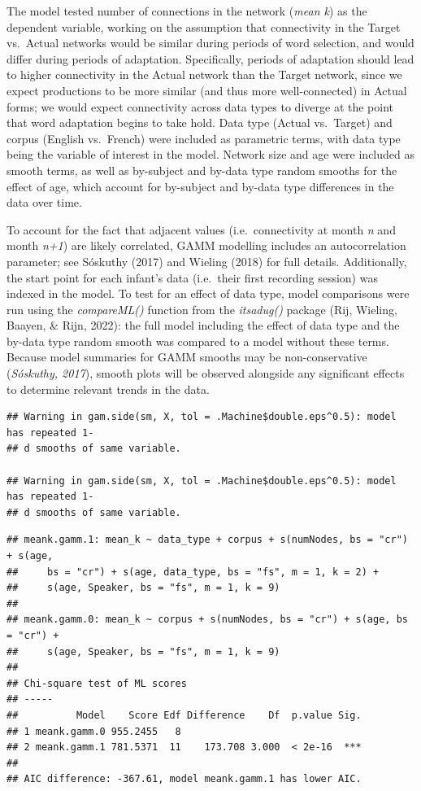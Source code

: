\documentclass[
  man]{apa6}
\begin{document}
The model tested number of connections in the network (\emph{mean k}) as the dependent variable, working on the assumption that connectivity in the Target vs.~Actual networks would be similar during periods of word selection, and would differ during periods of adaptation. Specifically, periods of adaptation should lead to higher connectivity in the Actual network than the Target network, since we expect productions to be more similar (and thus more well-connected) in Actual forms; we would expect connectivity across data types to diverge at the point that word adaptation begins to take hold. Data type (Actual vs.~Target) and corpus (English vs.~French) were included as parametric terms, with data type being the variable of interest in the model. Network size and age were included as smooth terms, as well as by-subject and by-data type random smooths for the effect of age, which account for by-subject and by-data type differences in the data over time.

To account for the fact that adjacent values (i.e.~connectivity at month \emph{n} and month \emph{n+1}) are likely correlated, GAMM modelling includes an autocorrelation parameter; see Sóskuthy (2017) and Wieling (2018) for full details. Additionally, the start point for each infant's data (i.e.~their first recording session) was indexed in the model. To test for an effect of data type, model comparisons were run using the \emph{compareML()} function from the \emph{itsadug()} package (Rij, Wieling, Baayen, \& Rijn, 2022): the full model including the effect of data type and the by-data type random smooth was compared to a model without these terms. Because model summaries for GAMM smooths may be non-conservative (\emph{Sóskuthy, 2017}), smooth plots will be observed alongside any significant effects to determine relevant trends in the data.

\begin{verbatim}
## Warning in gam.side(sm, X, tol = .Machine$double.eps^0.5): model has repeated 1-
## d smooths of same variable.

## Warning in gam.side(sm, X, tol = .Machine$double.eps^0.5): model has repeated 1-
## d smooths of same variable.
\end{verbatim}

\begin{verbatim}
## meank.gamm.1: mean_k ~ data_type + corpus + s(numNodes, bs = "cr") + s(age, 
##     bs = "cr") + s(age, data_type, bs = "fs", m = 1, k = 2) + 
##     s(age, Speaker, bs = "fs", m = 1, k = 9)
## 
## meank.gamm.0: mean_k ~ corpus + s(numNodes, bs = "cr") + s(age, bs = "cr") + 
##     s(age, Speaker, bs = "fs", m = 1, k = 9)
## 
## Chi-square test of ML scores
## -----
##          Model    Score Edf Difference    Df  p.value Sig.
## 1 meank.gamm.0 955.2455   8                               
## 2 meank.gamm.1 781.5371  11    173.708 3.000  < 2e-16  ***
## 
## AIC difference: -367.61, model meank.gamm.1 has lower AIC.
\end{verbatim}
\end{document}
